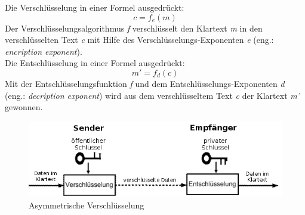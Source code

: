 Die Verschlüsselung in einer Formel ausgedrückt:
\begin{equation*}
  c = f_e (m)
  \label{eqn:asy_versch}
\end{equation*}
Der Verschlüsselungsalgorithmus \textit{f} verschlüsselt den Klartext \textit{m} in den verschlüsselten Text \textit{c} mit Hilfe des Verschlüsselungs-Exponenten \textit{e} (eng.: \textit{encription exponent}).\\
Die Entschlüsselung in einer Formel ausgedrückt:
\begin{equation*}
  m' = f_d (c) 
  \label{eqn:asy_entsch}
\end{equation*}
Mit der Entschlüsselungsfunktion \textit{f} und dem Entschlüsselungs-Exponenten \textit{d} (eng.: \textit{decription exponent}) wird aus dem verschlüsseltem Text \textit{c} der Klartext \textit{m'} gewonnen.
%
%
\begin{figure}[ht]
\begin{center}
\includegraphics[width=15cm]{images/asymmetrischeVerschluesselung.png}
\caption{Asymmetrische Verschlüsselung}
\end{center}
\end{figure}

